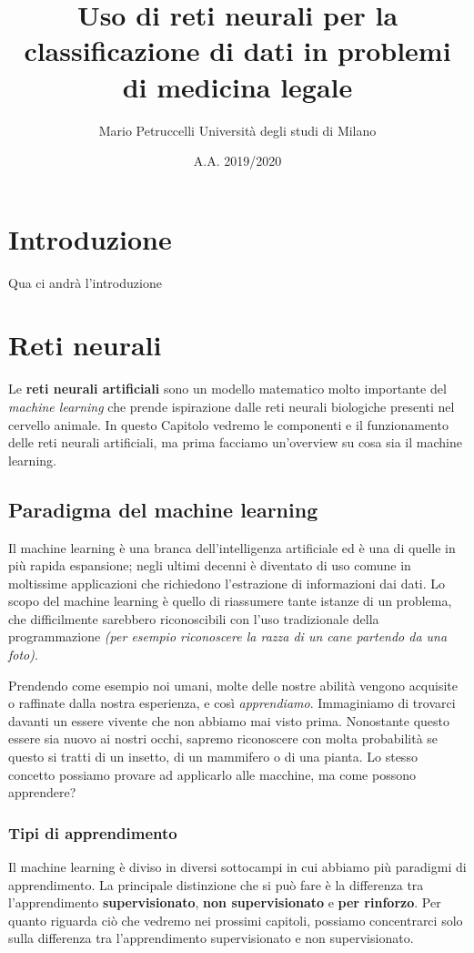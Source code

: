 \documentclass[12pt, twoside, letterpaper]{report}
\title{Uso di reti neurali per la classificazione di dati in problemi di medicina legale}
\author{Mario Petruccelli \cr Università degli studi di Milano}
\date{A.A. 2019/2020}
\begin{document}
	\begin{titlepage}
		
		\newpage
		\tableofcontents
		\thispagestyle{empty}
	\end{titlepage}

	\chapter*{Introduzione}     
		Qua ci andrà l'introduzione

		\newpage		
	\chapter{Reti neurali}
		Le \textbf{reti neurali artificiali} sono un modello matematico molto importante del \textit{machine learning} che prende ispirazione dalle reti neurali biologiche presenti nel cervello animale. In questo Capitolo vedremo le componenti e il funzionamento delle reti neurali artificiali, ma prima facciamo un'overview su cosa sia il machine learning.

		\section{Paradigma del machine learning}
			Il machine learning è una branca dell'intelligenza artificiale ed è una di quelle in più rapida espansione; negli ultimi decenni è diventato di uso comune in moltissime applicazioni che richiedono l'estrazione di informazioni dai dati. Lo scopo del machine learning è quello di riassumere tante istanze di un problema, che difficilmente sarebbero riconoscibili con l'uso tradizionale della programmazione \textit{(per esempio riconoscere la razza di un cane partendo da una foto)}.   
			
			Prendendo come esempio noi umani, molte delle nostre abilità vengono acquisite o raffinate dalla nostra esperienza, e così \textit{apprendiamo}. Immaginiamo di trovarci davanti un essere vivente che non abbiamo mai visto prima. Nonostante questo essere sia nuovo ai nostri occhi, sapremo riconoscere con molta probabilità se questo si tratti di un insetto, di un mammifero o di una pianta. Lo stesso concetto possiamo provare ad applicarlo alle macchine, ma come possono apprendere? 
			
			\subsection{Tipi di apprendimento} Il machine learning è diviso in diversi sottocampi in cui abbiamo più paradigmi di apprendimento. La principale distinzione che si può fare è la differenza tra l'apprendimento \textbf{supervisionato}, \textbf{non supervisionato} e \textbf{per rinforzo}. Per quanto riguarda ciò che vedremo nei prossimi capitoli, possiamo concentrarci solo sulla differenza tra l'apprendimento supervisionato e non supervisionato.
			
\end{document}
